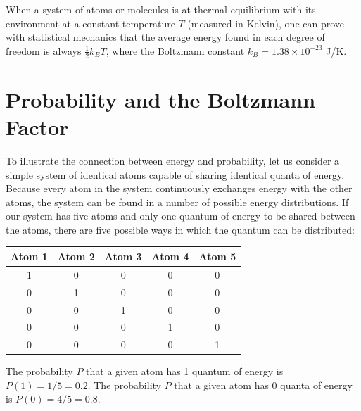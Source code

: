 When a system of atoms or molecules is at thermal equilibrium with its environment at a  constant temperature $T$ (measured in Kelvin), one can prove with statistical mechanics that the average energy found in each degree of freedom is always $\frac{1}{2}k_BT$, where the Boltzmann constant $k_B = 1.38\times10^{-23}$ J/K.

\section{Probability and the Boltzmann Factor}

To illustrate the connection between energy and probability, let us consider a simple system of identical atoms capable of sharing identical quanta of energy.  Because every atom in the system continuously exchanges energy with the other atoms, the system can be found in a number of possible energy distributions.  If our system has five atoms and only one quantum of energy to be shared between the atoms, there are five possible ways in which the quantum can be distributed:
\begin{table}[htb]
\begin{center}
\begin{tabular}{ccccc}
\hline
Atom 1 & Atom 2 & Atom 3 & Atom 4 & Atom 5 \\
\hline
1 &	0 &	0 &	0 &	0\\
0 &	1 &	0 &	0 &	0\\
0 &	0 &	1 &	0 &	0\\
0 &	0 &	0 &	1 &	0\\
0 &	0 &	0 &	0 &	1\\
\hline
\end{tabular}
\label{table8-1}
\end{center}
\end{table}
The probability $P$ that a given atom has 1 quantum of energy is $P(1) = 1/5 = 0.2$. The probability $P$ that a given atom has 0 quanta of energy is $P(0) = 4/5 = 0.8$.

